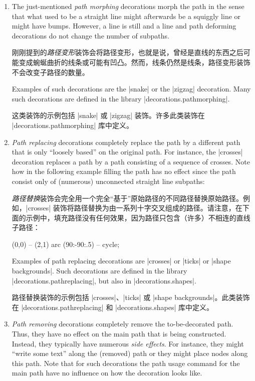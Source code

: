 \begin{enumerate}
    \item The just-mentioned \emph{path morphing} decorations morph the path in
        the sense that what used to be a straight line might afterwards be a
        squiggly line or might have bumps. However, a line is still and a line
        and path deforming decorations do not change the number of subpaths.

        刚刚提到的\emph{路径变形}装饰会将路径变形，也就是说，曾经是直线的东西之后可能变成蜿蜒曲折的线条或可能有凹凸。然而，线条仍然是线条，路径变形装饰不会改变子路径的数量。

        Examples of such decorations are the |snake| or the |zigzag|
        decoration. Many such decorations are defined in the library
        |decorations.pathmorphing|.

        这类装饰的示例包括 |snake| 或 |zigzag| 装饰。许多此类装饰在 |decorations.pathmorphing| 库中定义。

        \item \emph{Path replacing} decorations completely replace the path by a
        different path that is only ``loosely based'' on the original path. For
        instance, the |crosses| decoration replaces a path by a path consisting
        of a sequence of crosses. Note how in the following example filling the
        path has no effect since the path consist only of (numerous)
        unconnected straight line subpaths:
        
        \emph{路径替换}装饰会完全用一个完全“基于”原始路径的不同路径替换原始路径。例如，|crosses| 装饰将路径替换为由一系列十字交叉组成的路径。请注意，在下面的示例中，填充路径没有任何效果，因为路径只包含（许多）不相连的直线子路径：


\begin{codeexample}[preamble={\usetikzlibrary{decorations.shapes}}]
\tikz \fill [decorate,decoration={crosses}]
  [fill=blue!20,draw=blue,thick] (0,0) -- (2,1) arc (90:-90:.5) -- cycle;
\end{codeexample}

        Examples of path replacing decorations are |crosses| or |ticks| or
        |shape backgrounds|. Such decorations are defined in the library
        |decorations.pathreplacing|, but also in |decorations.shapes|.

        路径替换装饰的示例包括 |crosses|、|ticks| 或 |shape backgrounds|。此类装饰在 |decorations.pathreplacing| 和 |decorations.shapes| 库中定义。

        \item \emph{Path removing} decorations completely remove the
        to-be-decorated path. Thus, they have no effect on the main path that
        is being constructed. Instead, they typically have numerous \emph{side
        effects}. For instance, they might ``write some text'' along the
        (removed) path or they might place nodes along this path. Note that for
        such decorations the path usage command for the main path have no
        influence on how the decoration looks like.
        

\end{enumerate}
